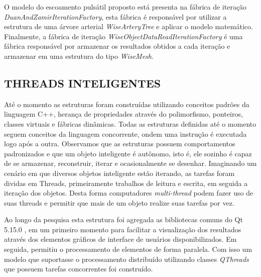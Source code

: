 \documentclass[a4paper,12pt]{monografia}
\theoremstyle{plain}
\theoremstyle{definition}
\theoremstyle{remark}
\begin{document}
O modelo do escoamento pulsátil proposto está presenta na fábrica de iteração \textit{DuanAndZamirIterationFactory}, esta fábrica é responsável por utilizar a estrutura de uma árvore arterial \textit{WiseArteryTree} e aplicar o modelo matemático. Finalmente, a fábrica de iteração \textit{WiseObjectDataReadIterationFactory} é uma fábrica responsável por armazenar os resultados obtidos a cada iteração e armazenar em uma estrutura do tipo \textit{WiseMesh}.

\subsection{THREADS INTELIGENTES}\label{sec:threads}

Até o momento as estruturas foram construídas utilizando conceitos padrões da linguagem C++, herança de propriedades através do polimorfismo, ponteiros, classes virtuais e fábricas dinâmicas. Todas as estruturas definidas até o momento seguem conceitos da linguagem concorrente, ondem uma instrução é executada logo após a outra. Observamos que as estruturas possuem comportamentos padronizados e que um objeto inteligente é autônomo, isto é, ele sozinho é capaz de se armazenar, reconstruir, iterar e ocasionalmente se desenhar. Imaginando um cenário em que diversos objetos inteligente estão iterando, as tarefas foram dividas em Threads, primeiramente trabalhos de leitura e escrita, em seguida a iteração dos objetos. Desta forma computadores \textit{multi-thread} podem fazer uso de suas threads e permitir que mais de um objeto realize suas tarefas por vez.

Ao longo da pesquisa esta estrutura foi agregada as bibliotecas comuns do Qt 5.15.0 \cite{QTClasses}, em um primeiro momento para facilitar a visualização dos resultados através dos elementos gráficos de interface de usuários disponibilizados. Em seguida, permitiu o processamento de elementos de forma paralela. Com isso um modelo que suportasse o processamento distribuído utilizando classes \textit{QThreads} que possuem tarefas concorrentes foi construído.
\end{document}
